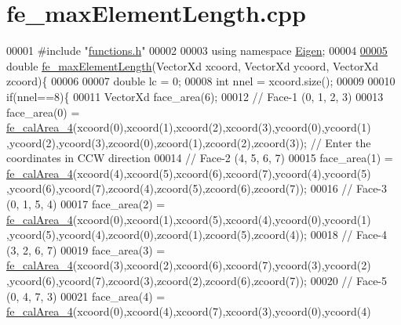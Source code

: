 \hypertarget{fe__max_element_length_8cpp_source}{}\section{fe\+\_\+max\+Element\+Length.\+cpp}
\label{fe__max_element_length_8cpp_source}

\begin{DoxyCode}
00001 \textcolor{preprocessor}{#include "\hyperlink{functions_8h}{functions.h}"}
00002 
00003 \textcolor{keyword}{using namespace }\hyperlink{namespace_eigen}{Eigen};
00004 
\hyperlink{fe__max_element_length_8cpp_aa11bdbf370d88d267313624c85c28e70}{00005} \textcolor{keywordtype}{double} \hyperlink{fe__max_element_length_8cpp_aa11bdbf370d88d267313624c85c28e70}{fe\_maxElementLength}(VectorXd xcoord, VectorXd ycoord, VectorXd zcoord)\{
00006 
00007     \textcolor{keywordtype}{double} lc = 0;
00008     \textcolor{keywordtype}{int} nnel = xcoord.size();
00009 
00010     \textcolor{keywordflow}{if}(nnel==8)\{
00011         VectorXd face\_area(6);
00012         \textcolor{comment}{// Face-1 (0, 1, 2, 3)}
00013         face\_area(0) = \hyperlink{functions_8h_ac1306a43db522f3da30471d2a6c48686}{fe\_calArea\_4}(xcoord(0),xcoord(1),xcoord(2),xcoord(3),ycoord(0),ycoord(1)
      ,ycoord(2),ycoord(3),zcoord(0),zcoord(1),zcoord(2),zcoord(3)); \textcolor{comment}{//  Enter the coordinates in CCW direction}
00014         \textcolor{comment}{// Face-2 (4, 5, 6, 7)}
00015         face\_area(1) = \hyperlink{functions_8h_ac1306a43db522f3da30471d2a6c48686}{fe\_calArea\_4}(xcoord(4),xcoord(5),xcoord(6),xcoord(7),ycoord(4),ycoord(5)
      ,ycoord(6),ycoord(7),zcoord(4),zcoord(5),zcoord(6),zcoord(7));
00016         \textcolor{comment}{// Face-3 (0, 1, 5, 4)}
00017         face\_area(2) = \hyperlink{functions_8h_ac1306a43db522f3da30471d2a6c48686}{fe\_calArea\_4}(xcoord(0),xcoord(1),xcoord(5),xcoord(4),ycoord(0),ycoord(1)
      ,ycoord(5),ycoord(4),zcoord(0),zcoord(1),zcoord(5),zcoord(4));
00018         \textcolor{comment}{// Face-4 (3, 2, 6, 7)}
00019         face\_area(3) = \hyperlink{functions_8h_ac1306a43db522f3da30471d2a6c48686}{fe\_calArea\_4}(xcoord(3),xcoord(2),xcoord(6),xcoord(7),ycoord(3),ycoord(2)
      ,ycoord(6),ycoord(7),zcoord(3),zcoord(2),zcoord(6),zcoord(7));
00020         \textcolor{comment}{// Face-5 (0, 4, 7, 3)}
00021         face\_area(4) = \hyperlink{functions_8h_ac1306a43db522f3da30471d2a6c48686}{fe\_calArea\_4}(xcoord(0),xcoord(4),xcoord(7),xcoord(3),ycoord(0),ycoord(4)

\end{DoxyCode}

